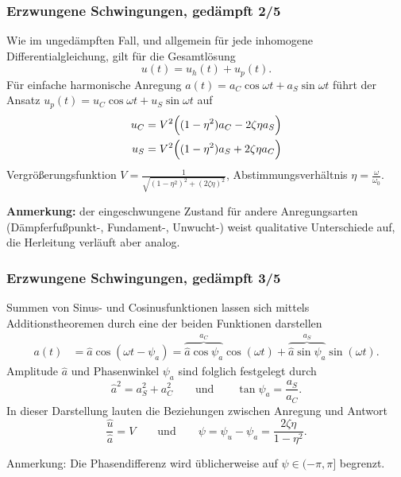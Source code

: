 \begin{frame}
\frametitle{Erzwungene Schwingungen, {\normalsize gedämpft 2/5}}
Wie im ungedämpften Fall, und allgemein für jede inhomogene Differentialgleichung, gilt für die Gesamtlösung
\begin{equation*}
 u(t)=u_h(t)+u_p(t).
\end{equation*}
Für einfache harmonische Anregung $a(t)=a_C\cos\omega t + a_S \sin \omega t$
führt der Ansatz $u_p(t)=u_C\cos\omega t + u_S\sin\omega t$ auf
\begin{align*}
u_C&= V^2 \Bigl( (1-\eta^2)a_C-2\zeta\eta a_S \Bigl)\\
u_S&= V^2 \Bigl( (1-\eta^2)a_S+2\zeta\eta a_C \Bigl)
\end{align*}
Vergrößerungsfunktion $V=\frac{1}{\sqrt{(1-\eta^2)^2+(2\zeta\eta)^2}}$, \hfill Abstimmungsverhältnis $\eta= \frac{\omega}{\omega_0}$.
\smallskip
\begin{center}
 \textbf{Anmerkung:} der eingeschwungene Zustand für andere Anregungsarten (Dämpferfußpunkt-, Fundament-, Unwucht-) weist qualitative Unterschiede auf, die Herleitung verläuft aber analog.
\end{center}
\end{frame}

\begin{frame}
\frametitle{Erzwungene Schwingungen, {\normalsize gedämpft 3/5}}
Summen von Sinus- und Cosinusfunktionen lassen sich mittels
Additionstheoremen durch eine der beiden Funktionen darstellen
\begin{align*}
a(t)&= \hat{a}\cos(\omega t - \psi_a) = 
 \overbrace{\hat{a}\cos\psi_a}^{a_C} \cos(\omega t) +
 \overbrace{\hat{a}\sin\psi_a}^{a_S} \sin(\omega t).%
 \end{align*}
 Amplitude $\hat{a}$ und Phasenwinkel $\psi_a$ sind folglich festgelegt durch
 \begin{equation*}
  \hat{a}^2 = a_S^2+a_C^2 \qquad \text{und} \qquad
  \tan\psi_a = \frac{a_S}{a_C}. 
\end{equation*}
In dieser Darstellung lauten die Beziehungen zwischen Anregung und Antwort
\begin{equation*}
\frac{\hat{u}}{\hat{a}}=V \qquad \text{und} \qquad
\psi=\psi_u -\psi_a =  \frac{2\zeta\eta}{1-\eta^2}.
\end{equation*}

Anmerkung: Die Phasendifferenz wird üblicherweise auf $\psi\in(-\pi,\pi]$ begrenzt.
\end{frame}


